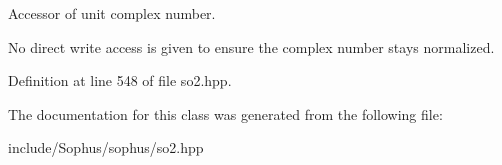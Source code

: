 Accessor of unit complex number. 

No direct write access is given to ensure the complex number stays normalized. 

Definition at line 548 of file so2.\+hpp.



The documentation for this class was generated from the following file\+:\begin{DoxyCompactItemize}
\item 
include/\+Sophus/sophus/so2.\+hpp\end{DoxyCompactItemize}
